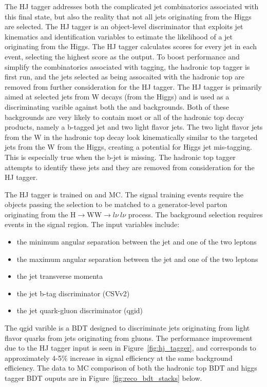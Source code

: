 The HJ tagger addresses both the complicated jet combinatorics associated with this final state, but also the reality that not all jets originating
from the Higgs are selected. The HJ tagger is an object-level discriminator that exploits jet kinematics and identification variables to estimate the likelihood
of a jet originating from the Higgs. The HJ tagger calculates scores for every jet in each event, selecting
the highest score as the output. To boost performance and simplify the combinatorics associated with tagging, the hadronic top tagger is first run,
and the jets selected as being assocaited with the hadronic top are removed from further consideration for the HJ tagger.
The HJ tagger is primarily aimed at selected jets from W decays (from the Higgs) and is used as a discriminating varible against both the \ttw and \ttz backgrounds.
Both of these
backgrounds are very likely to contain most or all of the hadronic top decay products, namely a b-tagged jet and two light flavor jets. The two light flavor jets from
the W in the hadronic top decay look kinematically similar to the targeted jets from the W from the Higgs, creating a potential for Higgs jet mis-tagging. This is
especially true when the b-jet is missing. The hadronic top tagger attempts to identify these jets and they are removed from consideration for the HJ tagger.

The HJ tagger is trained on \tth and \ttv MC. The signal training events require the objects passing the selection to be matched to a generator-level parton
originating from the H$\rightarrow$WW$\rightarrow l\nu~l\nu$ process. The background selection requires \ttv events in the signal region.  
The input variables include:
\begin{itemize}
\item the minimum angular separation between the jet and one of the two leptons
\item the maximum angular separation between the jet and one of the two leptons
\item the jet transverse momenta
\item the jet b-tag discriminator (CSVv2)
\item the jet quark-gluon discriminator (qgid)
\end{itemize}

\noindent The qgid varible is a BDT designed to discriminate jets originating from light flavor quarks from jets originating from gluons. The performance improvement due
to the HJ tagger input is seen in Figure~\ref{fig:hj_tagger}, and corresponds to approximately 4-5$\%$ increase in signal efficiency at the same background efficiency.
The data to MC comparison of both the hadronic top BDT and higgs tagger BDT ouputs are in Figure~\ref{fig:reco_bdt_stacks} below.

